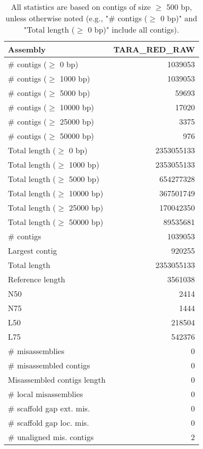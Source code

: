 \documentclass[12pt,a4paper]{article}
\begin{document}
\begin{table}[ht]
\begin{center}
\caption{All statistics are based on contigs of size $\geq$ 500 bp, unless otherwise noted (e.g., "\# contigs ($\geq$ 0 bp)" and "Total length ($\geq$ 0 bp)" include all contigs).}
\begin{tabular}{|l*{1}{|r}|}
\hline
Assembly & TARA\_RED\_RAW \\ \hline
\# contigs ($\geq$ 0 bp) & 1039053 \\ \hline
\# contigs ($\geq$ 1000 bp) & 1039053 \\ \hline
\# contigs ($\geq$ 5000 bp) & 59693 \\ \hline
\# contigs ($\geq$ 10000 bp) & 17020 \\ \hline
\# contigs ($\geq$ 25000 bp) & 3375 \\ \hline
\# contigs ($\geq$ 50000 bp) & 976 \\ \hline
Total length ($\geq$ 0 bp) & 2353055133 \\ \hline
Total length ($\geq$ 1000 bp) & 2353055133 \\ \hline
Total length ($\geq$ 5000 bp) & 654277328 \\ \hline
Total length ($\geq$ 10000 bp) & 367501749 \\ \hline
Total length ($\geq$ 25000 bp) & 170042350 \\ \hline
Total length ($\geq$ 50000 bp) & 89535681 \\ \hline
\# contigs & 1039053 \\ \hline
Largest contig & 920255 \\ \hline
Total length & 2353055133 \\ \hline
Reference length & 3561038 \\ \hline
N50 & 2414 \\ \hline
N75 & 1444 \\ \hline
L50 & 218504 \\ \hline
L75 & 542376 \\ \hline
\# misassemblies & 0 \\ \hline
\# misassembled contigs & 0 \\ \hline
Misassembled contigs length & 0 \\ \hline
\# local misassemblies & 0 \\ \hline
\# scaffold gap ext. mis. & 0 \\ \hline
\# scaffold gap loc. mis. & 0 \\ \hline
\# unaligned mis. contigs & 2 \\ \hline

\end{tabular}
\end{center}
\end{table}
\end{document}
